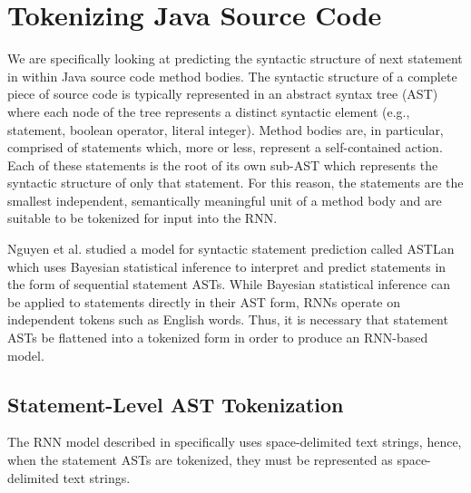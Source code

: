 \documentclass[runningheads,a4paper]{llncs}
\begin{document}


\section{Tokenizing Java Source Code}

We are specifically looking at predicting the syntactic structure  of next 
statement in within Java source code method bodies. The syntactic structure 
of a complete piece of source code is typically represented in an abstract 
syntax tree (AST) where each node of the tree represents a distinct 
syntactic element (e.g., statement, boolean operator, literal integer). 
Method bodies are, in particular, comprised of statements which, more or 
less, represent a self-contained action. Each of these statements is the 
root of its own sub-AST which represents the syntactic structure of only 
that statement. For this reason, the statements are the smallest 
independent, semantically meaningful unit of a method body and are suitable 
to be tokenized for input into the RNN.

Nguyen et al. \cite{Nguyen} studied a model for syntactic statement prediction 
called ASTLan which uses Bayesian statistical inference to interpret and 
predict statements in the form of sequential statement ASTs. While Bayesian 
statistical inference can be applied to statements directly in their AST 
form, RNNs operate on independent tokens such as English words. Thus, it is 
necessary that statement ASTs be flattened into a tokenized form in order to 
produce an RNN-based model.

\subsection{Statement-Level AST Tokenization}

The RNN model described in \citet{LSTMArticle} specifically uses space-delimited 
text strings, hence, when the statement ASTs are tokenized, they 
must be represented as space-delimited text strings.

\end{document}
